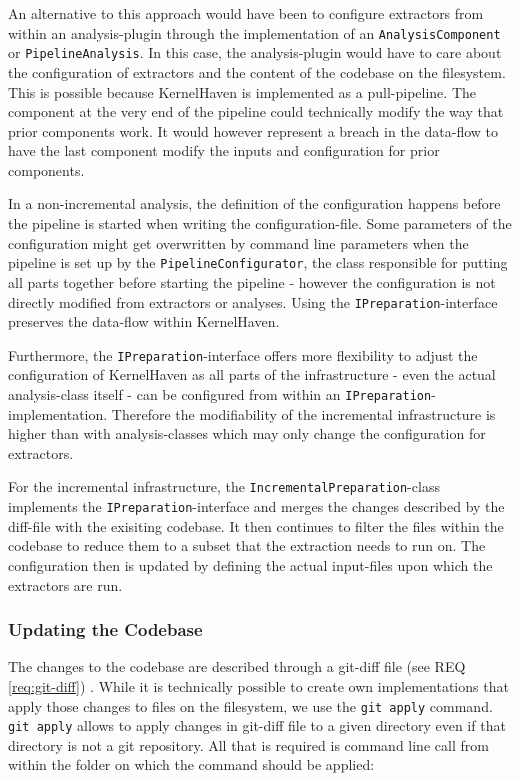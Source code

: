 \documentclass[a4paper]{article}
\begin{document}
An alternative to this approach would have been to configure extractors from within an analysis-plugin through the implementation of an \texttt{Analysis\-Component} or \texttt{PipelineAnalysis}. In this case, the analysis-plugin would have to care about the configuration of extractors and the content of the codebase on the filesystem. This is possible because KernelHaven is implemented as a pull-pipeline. The component at the very end of the pipeline could technically modify the way that prior components work. It would however represent a breach in the data-flow to have the last component modify the inputs and configuration for prior  components. 

In a non-incremental analysis, the definition of the configuration happens before the pipeline is started when writing the configuration-file. Some parameters of the configuration might get overwritten by command line parameters when the pipeline is set up by the \texttt{PipelineConfigurator}, the class responsible for putting all parts together before starting the pipeline - however the configuration is not directly modified from extractors or analyses. Using the \texttt{IPreparation}-interface preserves the data-flow within KernelHaven.

Furthermore, the \texttt{IPreparation}-interface offers more flexibility to adjust the configuration of KernelHaven as all parts of the infrastructure - even the actual analysis-class itself - can be configured from within an \texttt{IPreparation}-implementation. Therefore the modifiability of the incremental infrastructure is higher than with analysis-classes which may only change the configuration for extractors.

For the incremental infrastructure, the \texttt{Incremental\-Preparation}-class implements the \texttt{IPreparation}-interface and merges the changes described by the diff-file with the exisiting codebase. It then continues to filter the files within the codebase to reduce them to a subset that the extraction needs to run on. The configuration then is updated by defining the actual input-files upon which the extractors are run.

\subsubsection{Updating the Codebase}\label{git-apply}

The changes to the codebase are described through a git-diff file (see REQ \ref{req:git-diff}) . While it is technically possible to create own implementations that apply those changes to files on the filesystem, we use the \texttt{git apply} command. \texttt{git apply} allows to apply changes in git-diff file to a given directory even if that directory is not a git repository. All that is required is command line call from within the folder on which the command should be applied:
\end{document}
